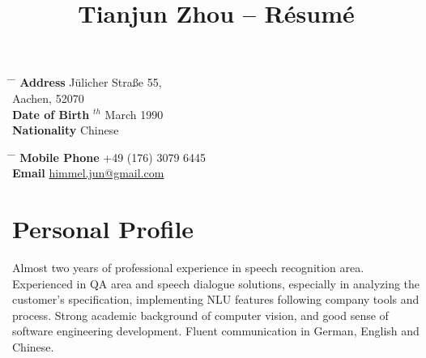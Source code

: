 \documentclass[10pt]{article} %
\begin{document}

\title{Tianjun Zhou -- Résumé} %


\parbox{0.5\textwidth}{ %
\begin{tabbing} %
\hspace{3cm} \= \hspace{4cm} \= \kill %
{\bf Address} \> J\"ulicher Stra\ss e 55,\\ %
\> Aachen, 52070 \\ %
{\bf Date of Birth} $^{th}$ March 1990 \\ %
{\bf Nationality} \> Chinese %
\end{tabbing}}
\hfill %
\parbox{0.5\textwidth}{ %
\begin{tabbing} %
\hspace{3cm} \= \hspace{4cm} \= \kill %
{\bf Mobile Phone} \> +49 (176) 3079 6445 \\ %
{\bf Email} \> \href{mailto:himmel.jun@gmail.com}{himmel.jun@gmail.com} \\ %
\end{tabbing}}


\section{Personal Profile}

Almost two years of professional experience in speech recognition area. Experienced in QA area and speech dialogue solutions, especially in analyzing the customer's specification, implementing NLU features following company tools and process. Strong academic background of computer vision, and good sense of software engineering development. Fluent communication in German, English and Chinese. 
\end{document}

